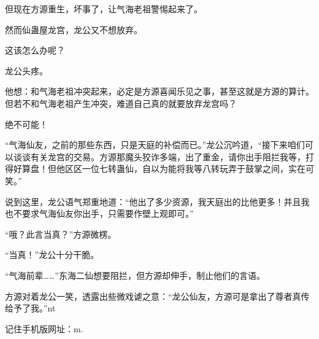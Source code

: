 \begin{this_body}
但现在方源重生，坏事了，让气海老祖警惕起来了。

然而仙蛊屋龙宫，龙公又不想放弃。

这该怎么办呢？

龙公头疼。

他想：和气海老祖冲突起来，必定是方源喜闻乐见之事，甚至这就是方源的算计。但若不和气海老祖产生冲突，难道自己真的就要放弃龙宫吗？

绝不可能！

“气海仙友，之前的那些东西，只是天庭的补偿而已。”龙公沉吟道，“接下来咱们可以谈谈有关龙宫的交易。方源那魔头狡诈多端，出了重金，请你出手阻拦我等，打得好算盘！但他区区一位七转蛊仙，自以为能将我等八转玩弄于鼓掌之间，实在可笑。”

说到这里，龙公语气郑重地道：“他出了多少资源，我天庭出的比他更多！并且我也不要求气海仙友你出手，只需要作壁上观即可。”

“哦？此言当真？”方源微楞。

“当真！”龙公十分干脆。

“气海前辈……”东海二仙想要阻拦，但方源却伸手，制止他们的言语。

方源对着龙公一笑，透露出些微戏谑之意：“龙公仙友，方源可是拿出了尊者真传给予了我。”nt

记住手机版网址：m.

\end{this_body}

